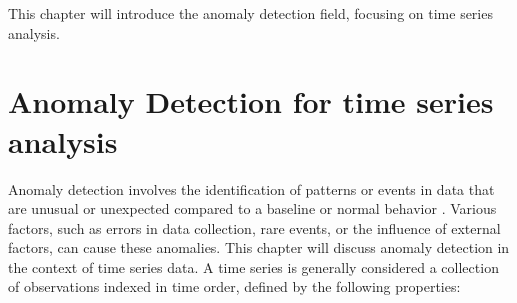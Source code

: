 \begin{chapabstract}
\small{
This chapter will introduce the anomaly detection field, focusing on time series analysis.
}\\
\begin{center}
\noindent\makebox[0.8\linewidth]{\rule{0.66\paperwidth}{0.4pt}}
\end{center}
\vspace{1cm}
\end{chapabstract}
\section{Anomaly Detection for time series analysis}
\label{s:anomaly-detection}
Anomaly detection involves the identification of patterns or events in data that are unusual or unexpected compared to a baseline or normal behavior \cite{chandola_2019}. Various factors, such as errors in data collection, rare events, or the influence of external factors, can cause these anomalies. This chapter will discuss anomaly detection in the context of time series data. A time series is generally considered a collection of observations indexed in time order, defined by the following properties:

